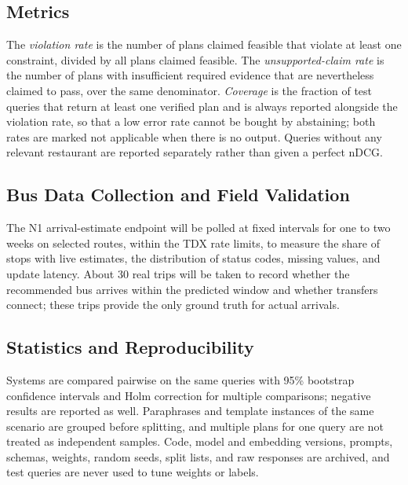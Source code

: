 \documentclass[conference]{IEEEtran}
\begin{document}
\subsection{Metrics}
The \emph{violation rate} is the number of plans claimed feasible that violate at least one constraint, divided by all plans claimed feasible. The \emph{unsupported-claim rate} is the number of plans with insufficient required evidence that are nevertheless claimed to pass, over the same denominator. \emph{Coverage} is the fraction of test queries that return at least one verified plan and is always reported alongside the violation rate, so that a low error rate cannot be bought by abstaining; both rates are marked not applicable when there is no output. Queries without any relevant restaurant are reported separately rather than given a perfect nDCG.

\subsection{Bus Data Collection and Field Validation}
The N1 arrival-estimate endpoint will be polled at fixed intervals for one to two weeks on selected routes, within the TDX rate limits, to measure the share of stops with live estimates, the distribution of status codes, missing values, and update latency. About 30 real trips will be taken to record whether the recommended bus arrives within the predicted window and whether transfers connect; these trips provide the only ground truth for actual arrivals.

\subsection{Statistics and Reproducibility}
Systems are compared pairwise on the same queries with 95\% bootstrap confidence intervals and Holm correction for multiple comparisons; negative results are reported as well. Paraphrases and template instances of the same scenario are grouped before splitting, and multiple plans for one query are not treated as independent samples. Code, model and embedding versions, prompts, schemas, weights, random seeds, split lists, and raw responses are archived, and test queries are never used to tune weights or labels.
\end{document}
